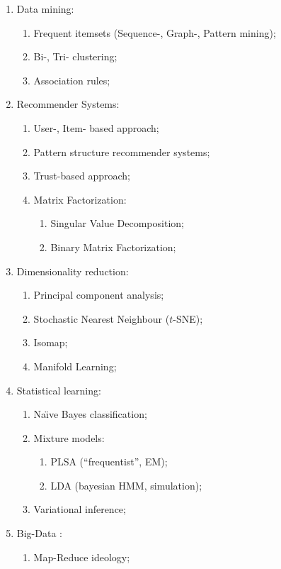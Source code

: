 \documentclass[a4paper]{article}
\begin{document}
\begin{enumerate}
\begin{enumerate}
  \end{enumerate}
  \item Data mining: \begin{enumerate}
    \item Frequent itemsets (Sequence-, Graph-, Pattern mining);
    \item Bi-, Tri- clustering;
    \item Association rules;
  \end{enumerate}
	\item Recommender Systems: \begin{enumerate}
		\item User-, Item- based approach;
    \item Pattern structure recommender systems;
    \item Trust-based approach;
    \item Matrix Factorization: \begin{enumerate}
      \item Singular Value Decomposition;
      \item Binary Matrix Factorization;
    \end{enumerate}
  \end{enumerate}
  \item Dimensionality reduction: \begin{enumerate}
    \item Principal component analysis;
    \item Stochastic Nearest Neighbour ($t$-SNE);
    \item Isomap;
    \item Manifold Learning;
  \end{enumerate}
  \item Statistical learning: \begin{enumerate}
    \item Na\"\i ve Bayes classification;
    \item Mixture models: \begin{enumerate}
      \item PLSA (``frequentist'', EM);
      \item LDA (bayesian HMM, simulation);
    \end{enumerate}
    \item Variational inference;
  \end{enumerate}
  \item Big-Data : \begin{enumerate}
    \item Map-Reduce ideology;

\end{enumerate}
\end{enumerate}
\end{document}
